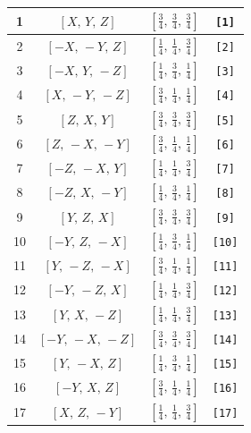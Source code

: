 \documentclass[fleqn,8pt]{jsarticle}
\begin{document}
\begin{longtable}{cccc}
1 & $\left[ X,\, Y,\, Z \right]$ & $\left[ \frac{3}{4},\, \frac{3}{4},\, \frac{3}{4} \right]$ & {\tt [1]} \\ \hline
2 & $\left[ - X,\, - Y,\, Z \right]$ & $\left[ \frac{1}{4},\, \frac{1}{4},\, \frac{3}{4} \right]$ & {\tt [2]} \\ \hline
3 & $\left[ - X,\, Y,\, - Z \right]$ & $\left[ \frac{1}{4},\, \frac{3}{4},\, \frac{1}{4} \right]$ & {\tt [3]} \\ \hline
4 & $\left[ X,\, - Y,\, - Z \right]$ & $\left[ \frac{3}{4},\, \frac{1}{4},\, \frac{1}{4} \right]$ & {\tt [4]} \\ \hline
5 & $\left[ Z,\, X,\, Y \right]$ & $\left[ \frac{3}{4},\, \frac{3}{4},\, \frac{3}{4} \right]$ & {\tt [5]} \\ \hline
6 & $\left[ Z,\, - X,\, - Y \right]$ & $\left[ \frac{3}{4},\, \frac{1}{4},\, \frac{1}{4} \right]$ & {\tt [6]} \\ \hline
7 & $\left[ - Z,\, - X,\, Y \right]$ & $\left[ \frac{1}{4},\, \frac{1}{4},\, \frac{3}{4} \right]$ & {\tt [7]} \\ \hline
8 & $\left[ - Z,\, X,\, - Y \right]$ & $\left[ \frac{1}{4},\, \frac{3}{4},\, \frac{1}{4} \right]$ & {\tt [8]} \\ \hline
9 & $\left[ Y,\, Z,\, X \right]$ & $\left[ \frac{3}{4},\, \frac{3}{4},\, \frac{3}{4} \right]$ & {\tt [9]} \\ \hline
10 & $\left[ - Y,\, Z,\, - X \right]$ & $\left[ \frac{1}{4},\, \frac{3}{4},\, \frac{1}{4} \right]$ & {\tt [10]} \\ \hline
11 & $\left[ Y,\, - Z,\, - X \right]$ & $\left[ \frac{3}{4},\, \frac{1}{4},\, \frac{1}{4} \right]$ & {\tt [11]} \\ \hline
12 & $\left[ - Y,\, - Z,\, X \right]$ & $\left[ \frac{1}{4},\, \frac{1}{4},\, \frac{3}{4} \right]$ & {\tt [12]} \\ \hline
13 & $\left[ Y,\, X,\, - Z \right]$ & $\left[ \frac{1}{4},\, \frac{1}{4},\, \frac{3}{4} \right]$ & {\tt [13]} \\ \hline
14 & $\left[ - Y,\, - X,\, - Z \right]$ & $\left[ \frac{3}{4},\, \frac{3}{4},\, \frac{3}{4} \right]$ & {\tt [14]} \\ \hline
15 & $\left[ Y,\, - X,\, Z \right]$ & $\left[ \frac{1}{4},\, \frac{3}{4},\, \frac{1}{4} \right]$ & {\tt [15]} \\ \hline
16 & $\left[ - Y,\, X,\, Z \right]$ & $\left[ \frac{3}{4},\, \frac{1}{4},\, \frac{1}{4} \right]$ & {\tt [16]} \\ \hline
17 & $\left[ X,\, Z,\, - Y \right]$ & $\left[ \frac{1}{4},\, \frac{1}{4},\, \frac{3}{4} \right]$ & {\tt [17]} \\ \hline

\end{longtable}
\end{document}
